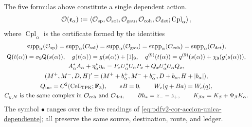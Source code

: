 The five formulas above constitute a single dependent action.
\begin{equation}
\label{eq:pdfv2-cor-accion-unica-dependiente}
 \mathcal O(\mathfrak e_\alpha)
 :=\left\langle
 \mathcal O_{\rm sp},\mathcal O_{\rm sol},\mathcal O_{\rm gau},
 \mathcal O_{\rm coh},\mathcal O_{\rm det};
 \operatorname{Cpl}_\alpha
 \right\rangle,
\end{equation}
where \(\operatorname{Cpl}_\alpha\) is the certificate formed by the
identities
\begin{equation}
\label{eq:pdfv2-cor-acoplamientos-unicos}
 \begin{gathered}
 \operatorname{supp}_\alpha(\mathcal O_{\rm sp})
 =\operatorname{supp}_\alpha(\mathcal O_{\rm sol})
 =\operatorname{supp}_\alpha(\mathcal O_{\rm gau})
 =\operatorname{supp}_\alpha(\mathcal O_{\rm coh})
 =\operatorname{supp}_\alpha(\mathcal O_{\rm det}),\\
 \mathsf Q(t(\alpha))=\sigma_9\mathsf Q(s(\alpha)),\quad
 g(t(\alpha))=g(s(\alpha))+[1]_9,\quad
 q^{(9)}(t(\alpha))=q^{(9)}(s(\alpha))+\chi_9(g(s(\alpha))),\\
 A_\alpha^*A_\alpha+\eta_\alpha^*\eta_\alpha
 =P_xU_\alpha^*U_\alpha P_x+Q_xU_\alpha^*U_\alpha Q_x,\\
 (M^+,M^-,D,H)'=(M^++b_\alpha^+,M^-+b_\alpha^-,
 D+b_\alpha,H+|b_\alpha|),\\
 Q_{\rm inc}=C^2(\operatorname{Cell}_{\rm TPK};\mathbf F_3),\qquad
 sB=0,\qquad W_c(q+Ba)=W_c(q),\\
 C_{y,N}\text{ is the same complex in }
 \mathcal O_{\rm coh}\text{ and }\mathcal O_{\rm det},\qquad
 \partial h_*=z_--z_+,\qquad
 K_{\beta\alpha}=K_\beta+\Psi_\beta K_\alpha.
 \end{gathered}
\end{equation}
The symbol \(\bullet\) ranges over the five readings of
\eqref{eq:pdfv2-cor-accion-unica-dependiente}; all preserve the same source, destination, route, and ledger.

